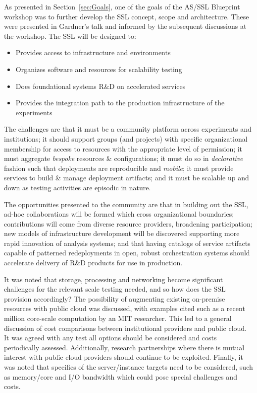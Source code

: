 \documentclass[11pt,letterpaper,fleqn]{article}
\begin{document}
As presented in Section~\ref{sec:Goals}, one of the goals of the AS/SSL Blueprint workshop was to further develop the SSL concept, scope and architecture. These were presented in Gardner's talk and informed by the subsequent discussions at the workshop. The SSL will be designed to:
\begin{itemize}
  \item Provides access to infrastructure and environments
  \item Organizes software and resources for scalability testing
  \item Does foundational systems R\&D on accelerated services
  \item Provides the integration path to the production infrastructure of the experiments
\end{itemize}

The challenges are that it must be a community platform across experiments and institutions; it should support groups (and projects) with specific organizational membership for access to resources with the appropriate level of permission; it must aggregate {\it bespoke} resources \& configurations; it must do so in {\it declarative} fashion such that deployments are reproducible and {\it mobile}; it must provide services to build \& manage deployment artifacts; and it must be scalable up and down as testing activities are episodic in nature.

The opportunities presented to the community are that in building out the SSL, ad-hoc collaborations will be formed which cross organizational boundaries; contributions will come from diverse resource providers, broadening participation; new models of infrastructure development will be discovered supporting more rapid innovation of analysis systems; and that having catalogs of service artifacts capable of patterned redeployments in open, robust orchestration systems should accelerate delivery of R\&D products for use in production.

It was noted that storage, processing and networking become significant challenges for the relevant scale testing needed, and so how does the SSL provision accordingly? The possibility of augmenting existing on-premise resources with public cloud was discussed, with examples cited such as a recent million core-scale computation by an MIT researcher.  This led to a general discussion of cost comparisons between institutional providers and public cloud. It was agreed with any test all options should be considered and costs periodically assessed.  Additionally, research partnerships where there is mutual interest with public cloud providers should continue to be exploited.  Finally, it was noted that specifics of the server/instance targets need to be considered, such as memory/core and I/O bandwidth which could pose special challenges and costs.
\end{document}
